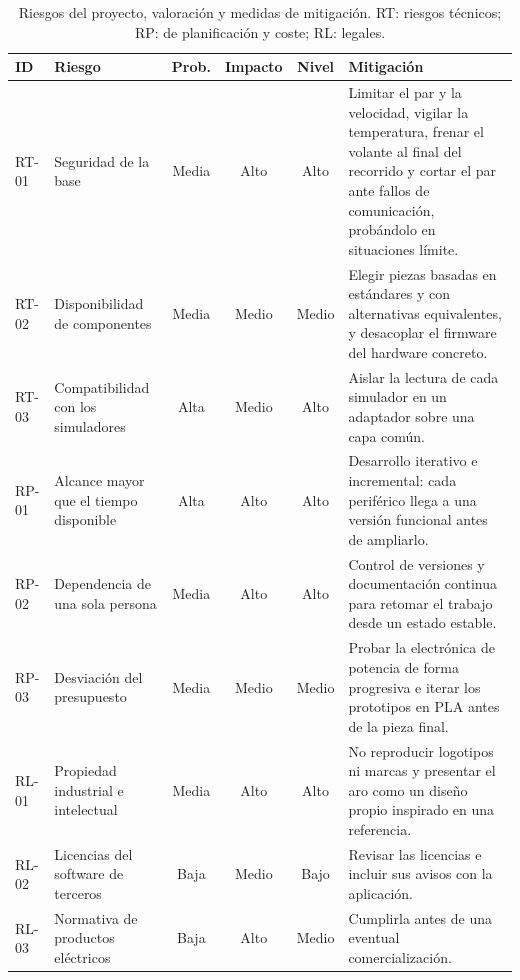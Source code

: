 \begin{table}[htbp]
	\centering
	\caption[Riesgos del proyecto, valoración y medidas de mitigación.]{Riesgos del proyecto, valoración y medidas de mitigación. RT: riesgos técnicos; RP: de planificación y coste; RL: legales.}
	\label{tab:riesgos}
	\small
	\begin{tabularx}{\textwidth}{@{}l>{\raggedright\arraybackslash}p{3.2cm}cccX@{}}
		\toprule
		\textbf{ID} & \textbf{Riesgo} & \textbf{Prob.} & \textbf{Impacto} & \textbf{Nivel} & \textbf{Mitigación} \\
		\midrule
		RT-01 & Seguridad de la base & Media & Alto & Alto &
		Limitar el par y la velocidad, vigilar la temperatura, frenar el volante al final del recorrido y cortar el par ante fallos de comunicación, probándolo en situaciones límite. \\
		RT-02 & Disponibilidad de componentes & Media & Medio & Medio &
		Elegir piezas basadas en estándares y con alternativas equivalentes, y desacoplar el firmware del hardware concreto. \\
		RT-03 & Compatibilidad con los simuladores & Alta & Medio & Alto &
		Aislar la lectura de cada simulador en un adaptador sobre una capa común. \\
		RP-01 & Alcance mayor que el tiempo disponible & Alta & Alto & Alto &
		Desarrollo iterativo e incremental: cada periférico llega a una versión funcional antes de ampliarlo. \\
		RP-02 & Dependencia de una sola persona & Media & Alto & Alto &
		Control de versiones y documentación continua para retomar el trabajo desde un estado estable. \\
		RP-03 & Desviación del presupuesto & Media & Medio & Medio &
		Probar la electrónica de potencia de forma progresiva e iterar los prototipos en PLA antes de la pieza final. \\
		RL-01 & Propiedad industrial e intelectual & Media & Alto & Alto &
		No reproducir logotipos ni marcas y presentar el aro como un diseño propio inspirado en una referencia. \\
		RL-02 & Licencias del software de terceros & Baja & Medio & Bajo &
		Revisar las licencias e incluir sus avisos con la aplicación. \\
		RL-03 & Normativa de productos eléctricos & Baja & Alto & Medio &
		Cumplirla antes de una eventual comercialización. \\
		\bottomrule
	\end{tabularx}
\end{table}

